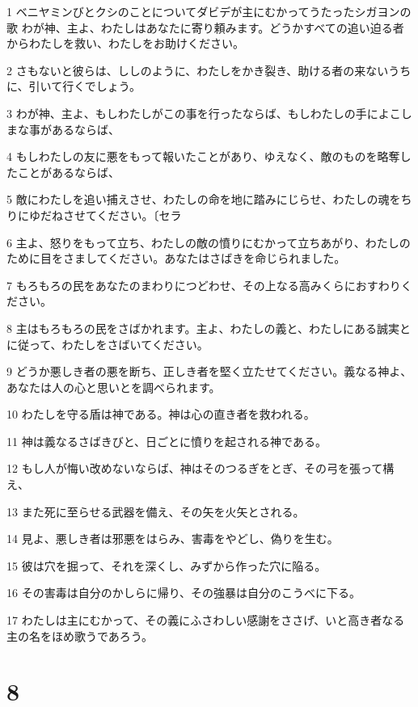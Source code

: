 \par 1 ベニヤミンびとクシのことについてダビデが主にむかってうたったシガヨンの歌 わが神、主よ、わたしはあなたに寄り頼みます。どうかすべての追い迫る者からわたしを救い、わたしをお助けください。
\par 2 さもないと彼らは、ししのように、わたしをかき裂き、助ける者の来ないうちに、引いて行くでしょう。
\par 3 わが神、主よ、もしわたしがこの事を行ったならば、もしわたしの手によこしまな事があるならば、
\par 4 もしわたしの友に悪をもって報いたことがあり、ゆえなく、敵のものを略奪したことがあるならば、
\par 5 敵にわたしを追い捕えさせ、わたしの命を地に踏みにじらせ、わたしの魂をちりにゆだねさせてください。〔セラ
\par 6 主よ、怒りをもって立ち、わたしの敵の憤りにむかって立ちあがり、わたしのために目をさましてください。あなたはさばきを命じられました。
\par 7 もろもろの民をあなたのまわりにつどわせ、その上なる高みくらにおすわりください。
\par 8 主はもろもろの民をさばかれます。主よ、わたしの義と、わたしにある誠実とに従って、わたしをさばいてください。
\par 9 どうか悪しき者の悪を断ち、正しき者を堅く立たせてください。義なる神よ、あなたは人の心と思いとを調べられます。
\par 10 わたしを守る盾は神である。神は心の直き者を救われる。
\par 11 神は義なるさばきびと、日ごとに憤りを起される神である。
\par 12 もし人が悔い改めないならば、神はそのつるぎをとぎ、その弓を張って構え、
\par 13 また死に至らせる武器を備え、その矢を火矢とされる。
\par 14 見よ、悪しき者は邪悪をはらみ、害毒をやどし、偽りを生む。
\par 15 彼は穴を掘って、それを深くし、みずから作った穴に陥る。
\par 16 その害毒は自分のかしらに帰り、その強暴は自分のこうべに下る。
\par 17 わたしは主にむかって、その義にふさわしい感謝をささげ、いと高き者なる主の名をほめ歌うであろう。

\chapter{8}

